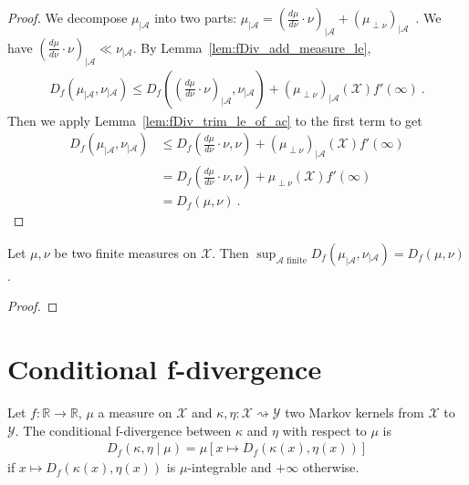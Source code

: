 \begin{proof}\leanok
{}
We decompose $\mu_{| \mathcal A}$ into two parts: $\mu_{| \mathcal A} = (\frac{d\mu}{d\nu}\cdot \nu)_{| \mathcal A} + (\mu_{\perp \nu})_{| \mathcal A}$~. 
We have $(\frac{d\mu}{d\nu}\cdot \nu)_{| \mathcal A} \ll \nu_{| \mathcal A}$.
By Lemma~\ref{lem:fDiv_add_measure_le},
\begin{align*}
D_f(\mu_{| \mathcal A}, \nu_{| \mathcal A})
\le D_f\left((\frac{d\mu}{d\nu}\cdot \nu)_{| \mathcal A}, \nu_{| \mathcal A}\right)
  + (\mu_{\perp \nu})_{| \mathcal A}(\mathcal X) f'(\infty)
\: .
\end{align*}
Then we apply Lemma~\ref{lem:fDiv_trim_le_of_ac} to the first term to get
\begin{align*}
D_f(\mu_{| \mathcal A}, \nu_{| \mathcal A})
&\le D_f\left(\frac{d\mu}{d\nu}\cdot \nu, \nu\right)
  + (\mu_{\perp \nu})_{| \mathcal A}(\mathcal X) f'(\infty)
\\
&= D_f\left(\frac{d\mu}{d\nu}\cdot \nu, \nu\right)
  + \mu_{\perp \nu}(\mathcal X) f'(\infty)
\\
&= D_f(\mu, \nu)
\: .
\end{align*}
\end{proof}

\begin{theorem}
  \label{thm:iSup_fDiv_trim}
  Let $\mu, \nu$ be two finite measures on $\mathcal X$. Then
  $\sup_{\mathcal A \text{ finite}} D_f(\mu_{| \mathcal A}, \nu_{| \mathcal A}) = D_f(\mu, \nu)$.
\end{theorem}

\begin{proof}
\end{proof}

\section{Conditional f-divergence}

\begin{definition}
  \label{def:condFDiv}
  \leanok
  Let $f : \mathbb{R} \to \mathbb{R}$, $\mu$ a measure on $\mathcal X$ and $\kappa, \eta : \mathcal X \rightsquigarrow \mathcal Y$ two Markov kernels from $\mathcal X$ to $\mathcal Y$. The conditional f-divergence between $\kappa$ and $\eta$ with respect to $\mu$ is
  \begin{align*}
  D_f(\kappa, \eta \mid \mu) = \mu\left[x \mapsto D_f(\kappa(x), \eta(x))\right]
  \end{align*}
  if $x \mapsto D_f(\kappa(x), \eta(x))$ is $\mu$-integrable and $+\infty$ otherwise.
\end{definition}

